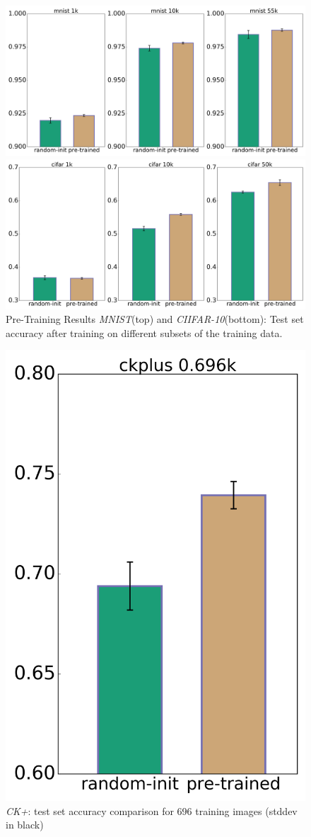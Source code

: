 \documentclass{article}
\begin{document}
    \begin{figure}
      \centering

      \includegraphics[width=.8\linewidth]{../box_plots/boxplots_mnist.png}

      \includegraphics[width=.8\linewidth]{../box_plots/boxplots_cifar.png}

      \caption{Pre-Training Results \emph{MNIST}(top) and \emph{CIIFAR-10}(bottom): Test set accuracy after training on different subsets of the training data.}
      \label{fig:mnist_cifar_plot}
    \end{figure}


    \begin{figure}
      \centering
      \includegraphics[width=0.33\linewidth]{../box_plots/boxplots_ckplus.png}
      \caption{\emph{CK+}: test set accuracy comparison for 696 training images (stddev in black)}
      \label{fig:ckplus_plot}
    \end{figure}
\end{document}
